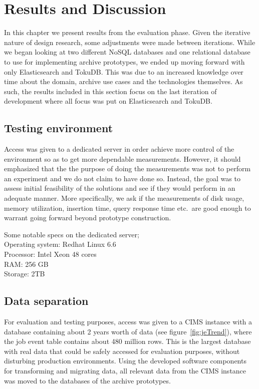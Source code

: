 \chapter{Results and Discussion}
\label{chap:results}

In this chapter we present results from the evaluation phase. Given the iterative nature of design research, some adjustments were made between iterations. While we began looking at two different NoSQL databases and one relational database to use for implementing archive prototypes, we ended up moving forward with only Elasticsearch and TokuDB. This was due to an increased knowledge over time about the domain, archive use cases and the technologies themselves. As such, the results included in this section focus on the last iteration of development where all focus was put on Elasticsearch and TokuDB.

\section{Testing environment}
Access was given to a dedicated server in order achieve more control of the environment so as to get more dependable measurements. However, it should emphasized that the the purpose of doing the measurements was not to perform an experiment and we do not claim to have done so. Instead, the goal was to assess initial feasibility of the solutions and see if they would perform in an adequate manner. More specifically, we ask if the measurements of disk usage, memory utilization, insertion time, query response time etc.\ are good enough to warrant going forward beyond prototype construction.

Some notable specs on the dedicated server; \\
Operating system: Redhat Linux 6.6 \\
Processor: Intel Xeon 48 cores \\
RAM: 256 GB \\
Storage: 2TB


\section{Data separation}
For evaluation and testing purposes, access was given to a CIMS instance with a database containing about 2 years worth of data (see figure~\ref{fig:jeTrend}), where the job event table contains about 480 million rows. This is the largest database with real data that could be safely accessed for evaluation purposes, without disturbing production environments. Using the developed software components for transforming and migrating data, all relevant data from the CIMS instance was moved to the databases of the archive prototypes.

